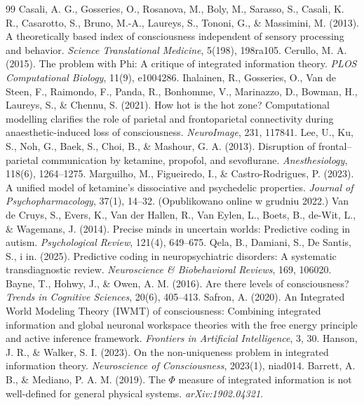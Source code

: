 \documentclass[11pt]{article}
\begin{document}
\begin{thebibliography}{99}
 Casali, A. G., Gosseries, O., Rosanova, M., Boly, M., Sarasso, S., Casali, K. R., Casarotto, S., Bruno, M.-A., Laureys, S., Tononi, G., \& Massimini, M. (2013). A theoretically based index of consciousness independent of sensory processing and behavior. \emph{Science Translational Medicine}, 5(198), 198ra105.
 Cerullo, M. A. (2015). The problem with Phi: A critique of integrated information theory. \emph{PLOS Computational Biology}, 11(9), e1004286.
 Ihalainen, R., Gosseries, O., Van de Steen, F., Raimondo, F., Panda, R., Bonhomme, V., Marinazzo, D., Bowman, H., Laureys, S., \& Chennu, S. (2021). How hot is the hot zone? Computational modelling clarifies the role of parietal and frontoparietal connectivity during anaesthetic-induced loss of consciousness. \emph{NeuroImage}, 231, 117841.
 Lee, U., Ku, S., Noh, G., Baek, S., Choi, B., \& Mashour, G. A. (2013). Disruption of frontal--parietal communication by ketamine, propofol, and sevoflurane. \emph{Anesthesiology}, 118(6), 1264--1275.
 Marguilho, M., Figueiredo, I., \& Castro-Rodrigues, P. (2023). A unified model of ketamine's dissociative and psychedelic properties. \emph{Journal of Psychopharmacology}, 37(1), 14--32. (Opublikowano online w grudniu 2022.)
 Van de Cruys, S., Evers, K., Van der Hallen, R., Van Eylen, L., Boets, B., de-Wit, L., \& Wagemans, J. (2014). Precise minds in uncertain worlds: Predictive coding in autism. \emph{Psychological Review}, 121(4), 649--675.
 Qela, B., Damiani, S., De Santis, S., i in. (2025). Predictive coding in neuropsychiatric disorders: A systematic transdiagnostic review. \emph{Neuroscience \& Biobehavioral Reviews}, 169, 106020.
 Bayne, T., Hohwy, J., \& Owen, A. M. (2016). Are there levels of consciousness? \emph{Trends in Cognitive Sciences}, 20(6), 405--413.
 Safron, A. (2020). An Integrated World Modeling Theory (IWMT) of consciousness: Combining integrated information and global neuronal workspace theories with the free energy principle and active inference framework. \emph{Frontiers in Artificial Intelligence}, 3, 30.
 Hanson, J. R., \& Walker, S. I. (2023). On the non-uniqueness problem in integrated information theory. \emph{Neuroscience of Consciousness}, 2023(1), niad014.
 Barrett, A. B., \& Mediano, P. A. M. (2019). The $\Phi$ measure of integrated information is not well-defined for general physical systems. \emph{arXiv:1902.04321}.

\end{thebibliography}
\end{document}
